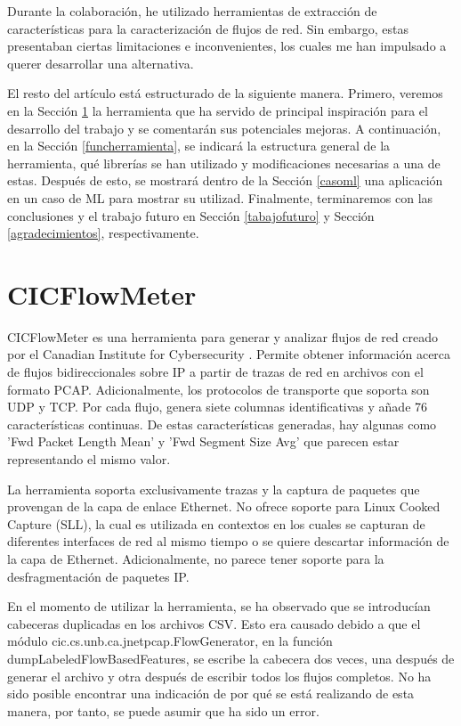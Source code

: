 \documentclass[10pt,a4paper,twoside]{article}
\begin{document}
\begin{multicols}{2}
    Durante la colaboración, he utilizado herramientas de extracción de características para la caracterización de flujos de red. Sin embargo, estas presentaban ciertas limitaciones e inconvenientes, los cuales me han impulsado a querer desarrollar una alternativa.

    El resto del artículo está estructurado de la siguiente manera. Primero, veremos en la Sección \ref{cicflowmeter} la herramienta que ha servido de principal inspiración para el desarrollo del trabajo y se comentarán sus potenciales mejoras. A continuación, en la Sección \ref{funcherramienta}, se indicará la estructura general de la herramienta, qué librerías se han utilizado y modificaciones necesarias a una de estas. Después de esto, se mostrará dentro de la Sección \ref{casoml} una aplicación en un caso de ML para mostrar su utilizad. Finalmente, terminaremos con las conclusiones y el trabajo futuro en Sección \ref{tabajofuturo} y Sección \ref{agradecimientos}, respectivamente.

    \section{CICFlowMeter} \label{cicflowmeter}

    CICFlowMeter es una herramienta para generar y analizar flujos de red creado por el Canadian Institute for Cybersecurity \cite{cicflowpost} \cite{icissp17} \cite{cicflowrepo}. Permite obtener información acerca de flujos bidireccionales sobre IP a partir de trazas de red en archivos con el formato PCAP. Adicionalmente, los protocolos de transporte que soporta son UDP y TCP. Por cada flujo, genera siete columnas identificativas y añade 76 características continuas. De estas características generadas, hay algunas como 'Fwd Packet Length Mean' y 'Fwd Segment Size Avg' que parecen estar representando el mismo valor.

    La herramienta soporta exclusivamente trazas y la captura de paquetes que provengan de la capa de enlace Ethernet. No ofrece soporte para Linux Cooked Capture (SLL), la cual es utilizada en contextos en los cuales se capturan de diferentes interfaces de red al mismo tiempo o se quiere descartar información de la capa de Ethernet. Adicionalmente, no parece tener soporte para la desfragmentación de paquetes IP.

    En el momento de utilizar la herramienta, se ha observado que se introducían cabeceras duplicadas en los archivos CSV. Esto era causado debido a que el módulo cic.cs.unb.ca.jnetpcap.FlowGenerator, en la función dumpLabeledFlowBasedFeatures, se escribe la cabecera dos veces, una después de generar el archivo y otra después de escribir todos los flujos completos. No ha sido posible encontrar una indicación de por qué se está realizando de esta manera, por tanto, se puede asumir que ha sido un error.


\end{multicols}
\end{document}
